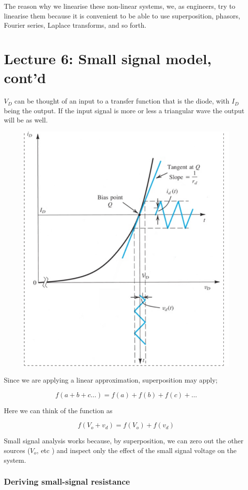\documentclass[../notes.tex]{subfiles}
\begin{document}
The reason why we linearise these non-linear systems, we, as engineers, try to linearise them because it is convenient to be able to use superposition, phasors, Fourier series, Laplace transforms, and so forth.


\section{Lecture 6: Small signal model, cont'd}


$ V_D $ can be thought of an input to a transfer function that is the diode, with $ I_D $ being the output. 
If the input signal is more or less a triangular wave the output will be as well.

\begin{figure}[H]
	\centering
	\includegraphics[width=0.5\linewidth]{img/image_2022-09-20-13-17-59.png}
\end{figure}

Since we are applying a linear approximation, superposition may apply;

\begin{equation}
	f(a+b+c\ldots) = f(a) + f(b) + f(c) + \ldots
\end{equation}


Here we can think of the function as

\begin{equation}
	f(V_o  + v_d) = f(V_o) + f(v_d)
\end{equation}

Small signal analysis works because, by superposition, we can zero out the other sources ($ V_o $, etc ) and inspect only the effect of the small signal voltage on the system.



\subsubsection{Deriving small-signal resistance}
\end{document}
